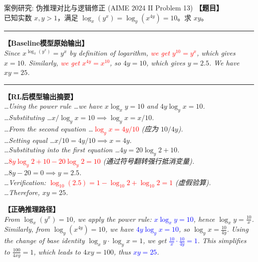 \documentclass[11pt, a4paper]{article} %
\begin{document}
\begin{casebox}{案例研究: 伪推理对比与逻辑修正 (AIME 2024 II Problem 13)}
	\textbf{【题目】} \\
	已知实数 $x, y > 1$，满足 $\log_x(y^x) = \log_y(x^{4y}) = 10$。求 $xy$。
	
	\vspace{8pt}
	\hrule
	\vspace{8pt}
	
	\textbf{【Baseline模型原始输出】} \\
	\textit{Since $x^{\log_x(y^x)} = y^x$ by definition of logarithm, \textcolor{red}{we get $y^{10} = y^x$}, which gives $x = 10$. Similarly, \textcolor{red}{we get $x^{4y} = x^{10}$}, so $4y = 10$, which gives $y = 2.5$. We have $xy = 25$.}
	
	\vspace{8pt}
	\hrule
	\vspace{8pt}
	
	\textbf{【RL后模型输出摘要】} \\
	\textit{
		\dots Using the power rule \dots we have $x \log_x y = 10$ and $4y \log_y x = 10$. \\
		\dots Substituting \dots $x / \log_y x = 10 \implies \log_y x = x/10$. \\
		\dots From the second equation \dots \textcolor{red}{$\log_y x = 4y/10$} (应为 $10/4y$). \\
		\dots Setting equal \dots $x/10 = 4y/10 \implies x = 4y$. \\
		\dots Substituting into the first equation \dots $4y = 20 \log_y 2 + 10$. \\
		\dots \textcolor{red}{$8y \log_y 2 + 10 - 20 \log_y 2 = 10$} (通过符号翻转强行抵消变量). \\
		\dots $8y - 20 = 0 \implies y = 2.5$. \\
		\dots Verification: \textcolor{red}{$\log_{10}(2.5) = 1 - \log_{10} 2 + \log_{10} 2 = 1$} (虚假验算). \\
		\dots Therefore, $xy = 25$. 
	}
	
	\textbf{【正确推理路径】} \\
	\textit{From $\log_x(y^x) = 10$, we apply the power rule: \textcolor{blue}{$x \log_x y = 10$}, hence $\log_x y = \frac{10}{x}$. Similarly, from $\log_y(x^{4y}) = 10$, we have \textcolor{blue}{$4y \log_y x = 10$}, so $\log_y x = \frac{10}{4y}$. Using the change of base identity $\log_x y \cdot \log_y x = 1$, we get \textcolor{blue}{$\frac{10}{x} \cdot \frac{10}{4y} = 1$}. This simplifies to $\frac{100}{4xy} = 1$, which leads to $4xy = 100$, thus \textcolor{blue}{$xy = 25$}.}
\end{casebox}
\end{document}
